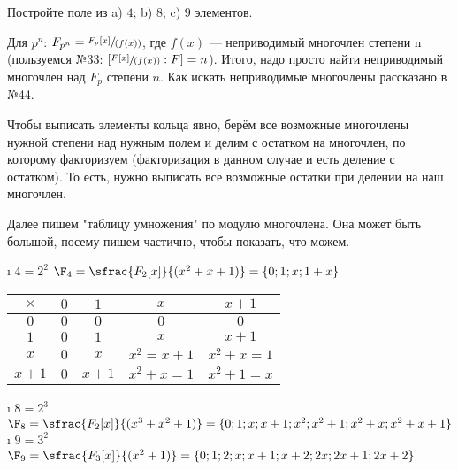 \begin{problem}[45 (11.3)]
Постройте поле из a) $4$; b) $8$; c) $9$ элементов.
\end{problem}
\begin{solution}

Для \(p^n\): \(F_{p^n} = \sfrac{F_p[x]}{(f(x))}\), где \(f(x)\) --- неприводимый многочлен степени n (пользуемся №33: $[\sfrac{F[x]}{(f(x))}:F] = n$). Итого, надо просто найти неприводимый многочлен над \(F_p\) степени \(n\). Как искать неприводимые многочлены рассказано в №44.

Чтобы выписать элементы кольца явно, берём все возможные многочлены нужной степени над нужным полем и делим с остатком на многочлен, по которому факторизуем (факторизация в данном случае и есть деление с остатком). То есть, нужно выписать все возможные остатки при делении на наш многочлен.

Далее пишем "таблицу умножения" по модулю многочлена. Она может быть большой, посему пишем частично, чтобы показать, что можем.

\begin{enumerate}
\def\labelenumi{\alph{enumi})}
\tightlist
\i
  \(4=2^2\)
  \(\F_4 = \sfrac{F_2[x]}{(x^2+x+1)} = \{0; 1;x;1+x\}\)
  
  
	\begin{table}[H]
	\centering
	\begin{tabular}{|c|c|c|c|c|}
	\hline
	$\times$  & $0$ & $1$ & $x$    & $x+1$ \\ \hline
	$0$  & $0$ & $0$  & $0$    & $0$ \\ \hline
	$1$  & $0$ & $1$  & $x$    & $x+1$\\ \hline
	$x$  & $0$ & $x$  & $x^2=x+1$ & $x^2+x=1$\\ \hline
	$x+1$& $0$ & $x+1$& $x^2+x=1$ & $x^2+1=x$\\ \hline
	\end{tabular}
	\end{table}
\i
  \(8=2^3\)
  \(\F_8 = \sfrac{F_2[x]}{(x^3+x^2+1)} = \{0; 1; x; x+1; x^2; x^2+1; x^2+x; x^2+x+1 \}\)
\i
  \(9=3^2\)
  \(\F_9 = \sfrac{F_3[x]}{(x^2+1)} = \{ 0; 1; 2; x; x+1; x+2; 2x; 2x+1; 2x+2\}\)
\end{enumerate}



\end{solution}


